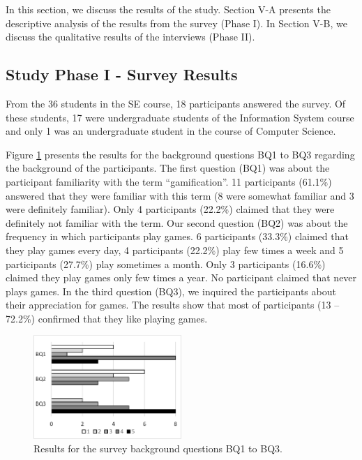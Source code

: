In this section, we discuss the results of the study. Section 
V-A presents the descriptive analysis of the results from the survey (Phase I). In Section V-B, we discuss the qualitative results of the interviews (Phase II).

\subsection{Study Phase I - Survey Results}

From the 36 students in the SE course, 18 participants answered the survey. Of these students, 17 were undergraduate students of the Information System course and only 1 was an undergraduate student in the course of Computer Science. 

Figure \ref{fig:gamificationbq} presents the results for the background questions BQ1 to BQ3 regarding the background of the participants. The first question (BQ1) was about the participant familiarity with the term “gamification”. 11 participants (61.1\%) answered that they were familiar with this term (8 were somewhat familiar and 3 were definitely familiar). Only 4 participants (22.2\%) claimed that they were definitely not familiar with the term. Our second question (BQ2) was about the frequency in which participants play games. 6 participants (33.3\%) claimed that they play games every day, 4 participants (22.2\%) play few times a week and 5 participants (27.7\%) play sometimes a month. Only 3 participants (16.6\%) claimed they play games only few times a year. No participant claimed that never plays games. In the third question (BQ3), we inquired the participants about their appreciation for games. The results show that most of participants (13 – 72.2\%) confirmed that they like playing games.

\begin{figure}[!h]%
\centering
\includegraphics[width = 0.5\textwidth]{img/gamificationBQ.png}
\caption{Results for the survey background questions BQ1 to BQ3.}
\label{fig:gamificationbq}
\end{figure}

